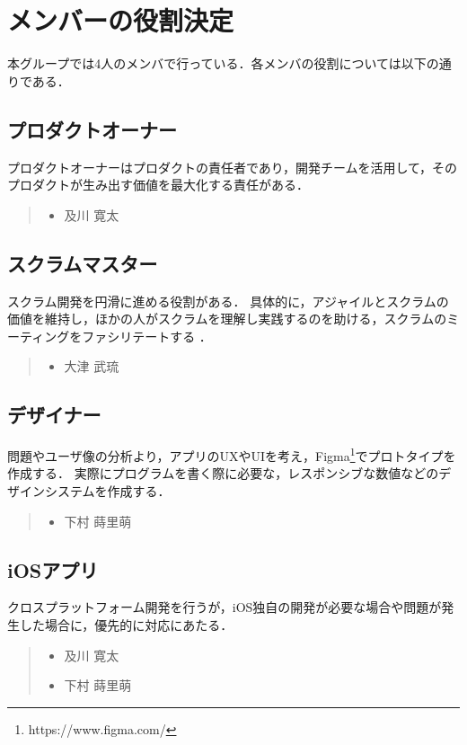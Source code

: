 \section{メンバーの役割決定}
本グループでは4人のメンバで行っている．各メンバの役割については以下の通りである．

\subsection{プロダクトオーナー}
プロダクトオーナーはプロダクトの責任者であり，開発チームを活用して，そのプロダクトが生み出す価値を最大化する責任がある\cite{scrum}．
\begin{quote}
    \begin{itemize}
        \item 及川 寛太
    \end{itemize}
\end{quote}

\subsection{スクラムマスター}
スクラム開発を円滑に進める役割がある．
具体的に，アジャイルとスクラムの価値を維持し，ほかの人がスクラムを理解し実践するのを助ける，スクラムのミーティングをファシリテートする \cite{scrum_master}．
\begin{quote}
    \begin{itemize}
        \item 大津 武琉
    \end{itemize}
\end{quote}

\subsection{デザイナー}
問題やユーザ像の分析より，アプリのUXやUIを考え，Figma\footnote{https://www.figma.com/}でプロトタイプを作成する．
実際にプログラムを書く際に必要な，レスポンシブな数値などのデザインシステムを作成する．
\begin{quote}
    \begin{itemize}
        \item 下村 蒔里萌
    \end{itemize}
\end{quote}

\subsection{iOSアプリ}
クロスプラットフォーム開発を行うが，iOS独自の開発が必要な場合や問題が発生した場合に，優先的に対応にあたる．
\begin{quote}
    \begin{itemize}
        \item 及川 寛太
        \item 下村 蒔里萌
    \end{itemize}
\end{quote}

